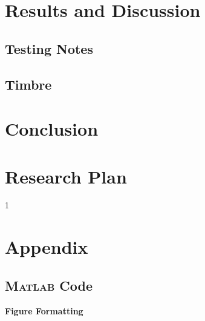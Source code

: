 \documentclass{article}
\begin{document}
\section{Results and Discussion}
\subsection{Testing Notes}
\subsection{Timbre}
\section{Conclusion}
\section{Research Plan}

\newpage
{}
\setcounter{page}1



\newpage
\section{Appendix}
\subsection{\textsc{Matlab} Code}

\noindent\textbf{Figure Formatting}


\end{document}
